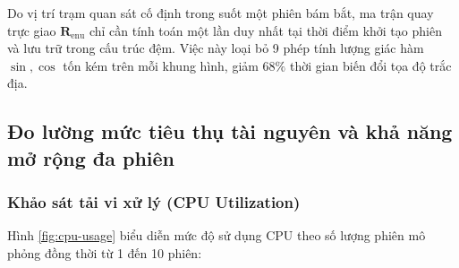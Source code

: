 \hspace{0.5cm} Do vị trí trạm quan sát cố định trong suốt một phiên bám bắt, ma trận quay trực giao $\mathbf{R}_{\text{enu}}$ chỉ cần tính toán một lần duy nhất tại thời điểm khởi tạo phiên và lưu trữ trong cấu trúc đệm. Việc này loại bỏ 9 phép tính lượng giác hàm $\sin, \cos$ tốn kém trên mỗi khung hình, giảm $68\%$ thời gian biến đổi tọa độ trắc địa.

\begin{table}[H]
\centering
\caption{So sánh hiệu năng hệ thống trước và sau khi áp dụng 3 giải pháp tối ưu hóa}
\label{tab:optimization-results-w12}
\end{table}

\subsection{Đo lường mức tiêu thụ tài nguyên và khả năng mở rộng đa phiên}

\subsubsection{Khảo sát tải vi xử lý (CPU Utilization)}

\hspace{0.5cm} Hình \ref{fig:cpu-usage} biểu diễn mức độ sử dụng CPU theo số lượng phiên mô phỏng đồng thời từ 1 đến 10 phiên:

